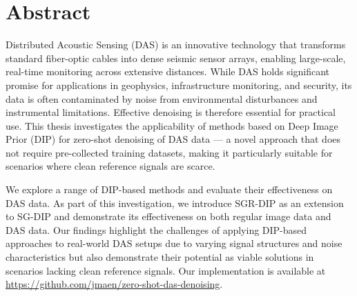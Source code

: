 \chapter*{Abstract}

Distributed Acoustic Sensing (DAS) is an innovative technology that transforms standard fiber-optic cables into dense seismic sensor arrays, enabling large-scale, real-time monitoring across extensive distances.
While DAS holds significant promise for applications in geophysics, infrastructure monitoring, and security, its data is often contaminated by noise from environmental disturbances and instrumental limitations.
Effective denoising is therefore essential for practical use.
This thesis investigates the applicability of methods based on Deep Image Prior (DIP) for zero-shot denoising of DAS data --- a novel approach that does not require pre-collected training datasets, making it particularly suitable for scenarios where clean reference signals are scarce.

We explore a range of DIP-based methods and evaluate their effectiveness on DAS data. As part of this investigation, we introduce SGR-DIP as an extension to SG-DIP and demonstrate its effectiveness on both regular image data and DAS data. Our findings highlight the challenges of applying DIP-based approaches to real-world DAS setups due to varying signal structures and noise characteristics but also demonstrate their potential as viable solutions in scenarios lacking clean reference signals. 
Our implementation is available at \url{https://github.com/jmaen/zero-shot-das-denoising}.

